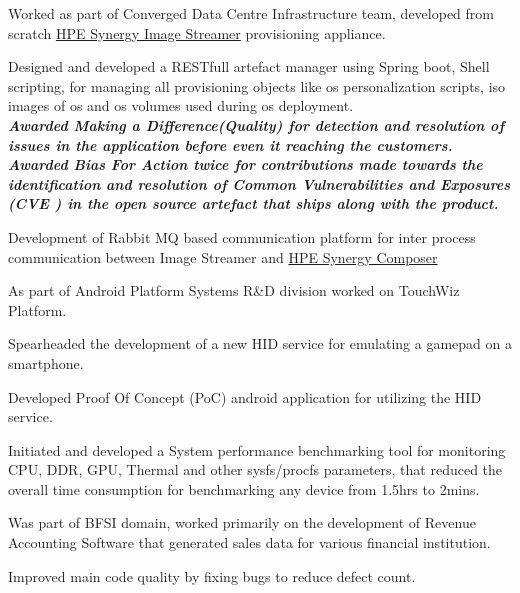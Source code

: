 \documentclass[]{kushal-resume}
\begin{document}
\begin{minipage}[t]{0.66\textwidth}
\begin{tightemize}
\item Worked as part of Converged Data Centre Infrastructure team, developed from scratch
\href{https://buy.hpe.com/us/en/synergy/synergy-management/synergy-image-streamer/synergy-image-streamer/hpe-synergy-image-streamer/p/1008615214}{HPE Synergy Image Streamer} provisioning appliance. 
\item Designed and developed a RESTfull artefact manager using Spring boot, Shell scripting, for managing all provisioning objects like os personalization scripts, iso images of os and os volumes used during os deployment. \\
	    {\footnotesize \textit{\textbf{Awarded Making a Difference(Quality) for detection and resolution of issues in the application before even it reaching the customers.}}} \\
	    {\footnotesize \textit{\textbf{Awarded Bias For Action twice for contributions made towards the identification and resolution of Common Vulnerabilities and Exposures (CVE ) in the open source artefact that ships along with the product. }}}  \\
 \item Development of Rabbit MQ based communication platform for inter process communication between Image Streamer and \href{https://buy.hpe.com/us/en/synergy/synergy-management/synergy-composer/synergy-composer/hpe-synergy-composer/p/1008615209}{HPE Synergy Composer}
\end{tightemize}
\sectionsep

\begin{tightemize}
\item As part of Android Platform Systems R\&D division worked on TouchWiz Platform.
\item Spearheaded the development of a new HID  service for emulating a gamepad on a smartphone.
\item Developed Proof Of Concept (PoC) android application for utilizing the HID service.
\item Initiated and developed a System performance benchmarking tool for monitoring CPU, DDR, GPU, Thermal and other sysfs/procfs parameters, that reduced the overall time consumption for benchmarking any device from 1.5hrs to 2mins.
\end{tightemize}
\sectionsep

\begin{tightemize}
\item Was part of BFSI domain, worked primarily on the development of Revenue Accounting Software that generated
 sales data for various financial institution. 
 \item Improved main code quality by fixing bugs to reduce defect count.
\end{tightemize}
\sectionsep


\end{minipage} 
\end{document}
